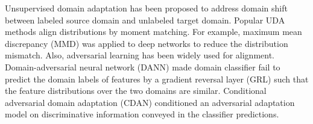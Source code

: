 \documentclass[10pt,journal,compsoc,twocolumn ]{IEEEtran}
\begin{document}
Unsupervised domain adaptation \cite{wang2018deep} has been proposed to address domain shift between labeled source domain and unlabeled target domain. Popular UDA methods \cite{Long2015Learning,sun2016deep,zellinger2017central,peng2019moment} align distributions by moment matching. For example, maximum mean discrepancy (MMD) \cite{Long2015Learning,long2017deep,Yan2017Mind,chen2019graph} was applied to deep networks to reduce the distribution mismatch. %
Also, adversarial learning \cite{Tzeng2017Adversarial,Ganin2015Unsupervised,pei2018multi,chadha2019improved} has been widely used for alignment. Domain-adversarial neural network (DANN) \cite{Ganin2015Unsupervised} made domain classifier fail to predict the domain labels of features by a gradient reversal layer (GRL) such that the feature distributions over the two domains are similar. Conditional adversarial domain adaptation (CDAN) \cite{long2018conditional} conditioned an adversarial adaptation model on discriminative information conveyed in the classifier predictions. %
\end{document}
